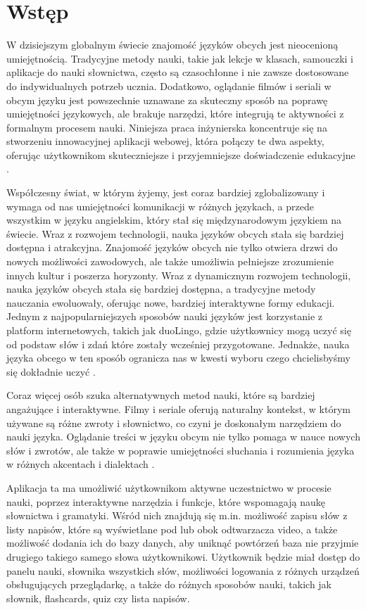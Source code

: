 \section{Wstęp}
W dzisiejszym globalnym świecie znajomość języków obcych jest nieocenioną umiejętnością. Tradycyjne metody nauki, takie jak lekcje w klasach, samouczki i aplikacje do nauki słownictwa, często są czasochłonne i nie zawsze dostosowane do indywidualnych potrzeb ucznia. Dodatkowo, oglądanie filmów i seriali w obcym języku jest powszechnie uznawane za skuteczny sposób na poprawę umiejętności językowych, ale brakuje narzędzi, które integrują te aktywności z formalnym procesem nauki. Niniejsza praca inżynierska koncentruje się na stworzeniu innowacyjnej aplikacji webowej, która połączy te dwa aspekty, oferując użytkownikom skuteczniejsze i przyjemniejsze doświadczenie edukacyjne \cite{tekalp2023effects}.

Współczesny świat, w którym żyjemy, jest coraz bardziej zglobalizowany i wymaga od nas umiejętności komunikacji w różnych językach, a przede wszystkim w języku angielskim, który stał się międzynarodowym językiem na świecie. Wraz z rozwojem technologii, nauka języków obcych stała się bardziej dostępna i atrakcyjna. Znajomość języków obcych nie tylko otwiera drzwi do nowych możliwości zawodowych, ale także umożliwia pełniejsze zrozumienie innych kultur i poszerza horyzonty. Wraz z dynamicznym rozwojem technologii, nauka języków obcych stała się bardziej dostępna, a tradycyjne metody nauczania ewoluowały, oferując nowe, bardziej interaktywne formy edukacji. Jednym z najpopularniejszych sposobów nauki języków jest korzystanie z platform internetowych, takich jak duoLingo, gdzie użytkownicy mogą uczyć się od podstaw słów i zdań które zostały wcześniej przygotowane. Jednakże, nauka języka obcego w ten sposób ogranicza nas w kwesti wyboru czego chcielisbyśmy się dokładnie uczyć \cite{ko2014learner}.

Coraz więcej osób szuka alternatywnych metod nauki, które są bardziej angażujące i interaktywne. Filmy i seriale oferują naturalny kontekst, w którym używane są różne zwroty i słownictwo, co czyni je doskonałym narzędziem do nauki języka. Oglądanie treści w języku obcym nie tylko pomaga w nauce nowych słów i zwrotów, ale także w poprawie umiejętności słuchania i rozumienia języka w różnych akcentach i dialektach \cite{talavan2006using}.

Aplikacja ta ma umożliwić użytkownikom aktywne uczestnictwo w procesie nauki, poprzez interaktywne narzędzia i funkcje, które wspomagają naukę słownictwa i gramatyki. Wśród nich znajdują się m.in. możliwość zapisu słów z listy napisów, które są wyświetlane pod lub obok odtwarzacza video, a także możliwość dodania ich do bazy danych, aby uniknąć powtórzeń baza nie przyjmie drugiego takiego samego słowa użytkownikowi. Użytkownik będzie miał dostęp do panelu nauki, słownika wszystkich słów, możliwości logowania z różnych urządzeń obsługujących przeglądarkę, a także do różnych sposobów nauki, takich jak słownik, flashcards, quiz czy lista napisów.


